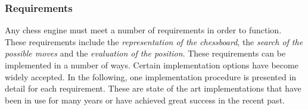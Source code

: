 \subsubsection{Requirements}

Any chess engine must meet a number of requirements in order to function. These requirements include the \textit{representation of the chessboard}, the \textit{search of the possible moves} and the \textit{evaluation of the position}. These requirements can be implemented in a number of ways. Certain implementation options have become widely accepted. In the following, one implementation procedure is presented in detail for each requirement. These are state of the art implementations that have been in use for many years or have achieved great success in the recent past.